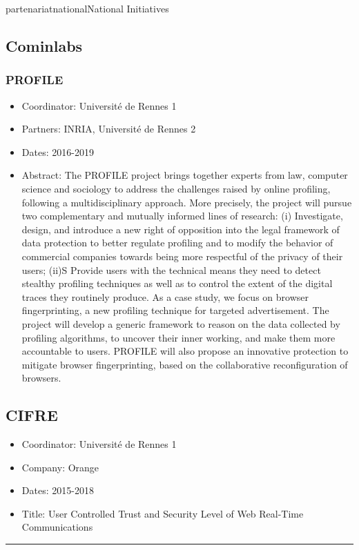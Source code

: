 \documentclass{ra2018}
\begin{document}
\begin{module}{partenariat}{national}{National Initiatives}
\subsection{Cominlabs}
\subsubsection*{\label{project:profile}PROFILE}

\begin{itemize}
	\item Coordinator: Universit\'e de Rennes 1
	\item Partners: INRIA, Universit\'e de Rennes 2
	\item Dates: 2016-2019
	\item Abstract:  The PROFILE project brings together experts from law, computer science and sociology to address the challenges raised by online profiling, following a multidisciplinary approach. More precisely, the project will pursue two complementary and mutually informed lines of research: (i) Investigate, design, and introduce a new right of opposition into the legal framework of data protection to better regulate profiling and to modify the behavior of commercial companies towards being more respectful of the privacy of their users; (ii)S Provide users with the technical means they need to detect stealthy profiling techniques as well as to control the extent of the digital traces they routinely produce. As a case study, we focus on browser fingerprinting, a new profiling technique for targeted advertisement. The project will develop a generic framework to reason on the data collected by profiling algorithms, to uncover their inner working, and make them more accountable to users. PROFILE will also propose an innovative protection to mitigate browser fingerprinting, based on the collaborative reconfiguration of browsers.
\end{itemize}

 \end{module} 


\subsection{CIFRE}

\begin{itemize}
	\item Coordinator: Universit\'e de Rennes 1
	\item Company: Orange
	\item Dates: 2015-2018
	\item Title: User Controlled Trust and Security Level of Web Real-Time Communications
\end{itemize}
\rule{\linewidth}{.2pt}
\end{document}
